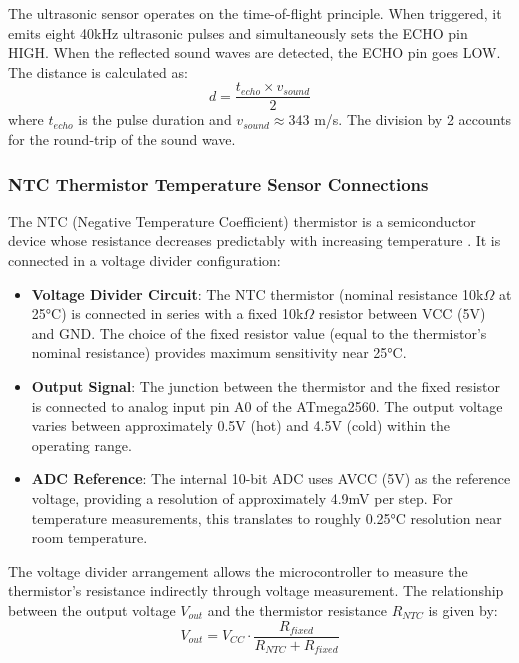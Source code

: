 The ultrasonic sensor operates on the time-of-flight principle. When triggered, it emits eight 40kHz ultrasonic pulses and simultaneously sets the ECHO pin HIGH. When the reflected sound waves are detected, the ECHO pin goes LOW. The distance is calculated as:
\begin{equation}
d = \frac{t_{echo} \times v_{sound}}{2}
\end{equation}
where $t_{echo}$ is the pulse duration and $v_{sound} \approx 343$ m/s. The division by 2 accounts for the round-trip of the sound wave.

\subsubsection{NTC Thermistor Temperature Sensor Connections}
The NTC (Negative Temperature Coefficient) thermistor is a semiconductor device whose resistance decreases predictably with increasing temperature \cite{ntc}. It is connected in a voltage divider configuration:

\begin{itemize}
    \item \textbf{Voltage Divider Circuit}: The NTC thermistor (nominal resistance 10k$\Omega$ at 25°C) is connected in series with a fixed 10k$\Omega$ resistor between VCC (5V) and GND. The choice of the fixed resistor value (equal to the thermistor's nominal resistance) provides maximum sensitivity near 25°C.
    \item \textbf{Output Signal}: The junction between the thermistor and the fixed resistor is connected to analog input pin A0 of the ATmega2560. The output voltage varies between approximately 0.5V (hot) and 4.5V (cold) within the operating range.
    \item \textbf{ADC Reference}: The internal 10-bit ADC uses AVCC (5V) as the reference voltage, providing a resolution of approximately 4.9mV per step. For temperature measurements, this translates to roughly 0.25°C resolution near room temperature.
\end{itemize}

The voltage divider arrangement allows the microcontroller to measure the thermistor's resistance indirectly through voltage measurement. The relationship between the output voltage $V_{out}$ and the thermistor resistance $R_{NTC}$ is given by:
\begin{equation}
V_{out} = V_{CC} \cdot \frac{R_{fixed}}{R_{NTC} + R_{fixed}}
\end{equation}

